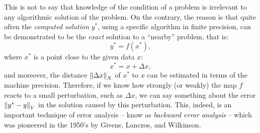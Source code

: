 This is not to say that knowledge of the condition of a problem is irrelevant to any algorithmic solution of the problem. On the contrary, the reason is that quite often the {\em computed solution} $y^*$, using a specific algorithm in finite precision, can be demonstrated to be the {\em exact} solution to a ``nearby'' problem, that is:
\begin{equation}
y^* = f(x^*),
\end{equation}
where $x^*$ is a point close to the given data $x$:
\begin{equation}
x^* = x+\Delta x,
\end{equation}
and moreover, the distance $\left\|{\Delta x}\right\|_X$ of $x^*$ to $x$ can be estimated in terms of the machine precision. Therefore, if we know how strongly (or weakly) the map $f$ reacts to a small perturbation, such as $\Delta x$, we can say something about the error $\left\|{y^*-y}\right\|_Y$ in the solution caused by this perturbation. This, indeed, is an important technique of error analysis -- know as {\em backward error analysis} -- which was pioneered in the 1950's by Givens, Lanczos, and Wilkinson.

